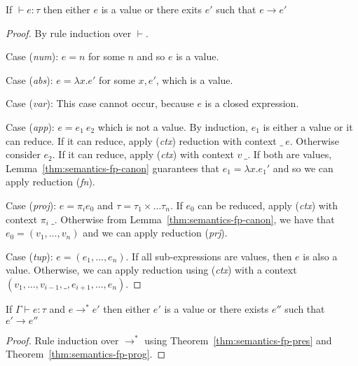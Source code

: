 \begin{theorem}[Progress]
\label{thm:semantics-fp-prog}  
  If $\vdash e : \tau$ then either $e$ is a value or there exits $e'$ such that $e \rightarrow e'$
\end{theorem}
\begin{proof}
  By rule induction over $\vdash$.
  
\vspace{0.25em}\noindent\hangindent=0.6cm 
Case (\emph{num}): $e = n$ for some $n$ and so $e$ is a value.

\vspace{0.25em}\noindent\hangindent=0.6cm 
Case (\emph{abs}): $e = \lambda x.e'$ for some $x, e'$, which is a value.

\vspace{0.25em}\noindent\hangindent=0.6cm 
Case (\emph{var}): This case cannot occur, because $e$ is a closed expression.

\vspace{0.25em}\noindent\hangindent=0.6cm 
Case (\emph{app}): $e = e_1~e_2$ which is not a value. By induction, $e_1$ is either
a value or it can reduce. If it can reduce, apply (\emph{ctx}) reduction with context $\_~e$. Otherwise
consider $e_2$. If it can reduce, apply (\emph{ctx}) with context $v~\_$. If both are values,
Lemma~\ref{thm:semantics-fp-canon} guarantees that $e_1 = \lambda x.e_1'$ and so we can apply
reduction (\emph{fn}).

\vspace{0.25em}\noindent\hangindent=0.6cm 
Case (\emph{proj}): $e = \pi_i e_0$ and $\tau=\tau_1\times\ldots\tau_n$. If $e_0$ can be reduced, 
  apply (\emph{ctx}) with context $\pi_i~\_$. Otherwise from Lemma~\ref{thm:semantics-fp-canon}, 
  we have that $e_0=(v_1, \ldots, v_n)$ and we can apply reduction (\emph{prj}).
  
\vspace{0.25em}\noindent\hangindent=0.6cm 
Case (\emph{tup}): $e = (e_1, \ldots, e_n)$. If all sub-expressions are values, then $e$ is also
  a value. Otherwise, we can apply reduction using (\emph{ctx}) with a context $(v_1, \ldots, v_{i-1}, \_, e_{i+1}, \ldots, e_n)$.
\end{proof}

\begin{theorem}[Safety]
  If $\Gamma \vdash e : \tau$ and $e \rightarrow^* e'$ then either $e'$ is a value or there
  exists $e''$ such that $e' \rightarrow e''$
\end{theorem}
\begin{proof}
  Rule induction over $\rightarrow^*$ using Theorem~\ref{thm:semantics-fp-pres} and Theorem~\ref{thm:semantics-fp-prog}.
\end{proof}

